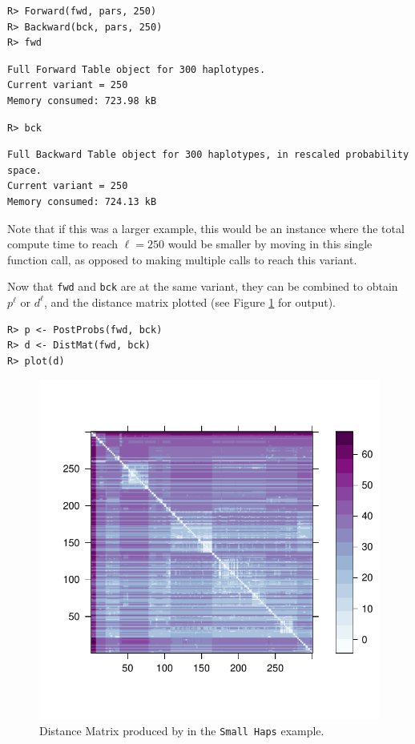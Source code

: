 \documentclass[a4paper]{article}
\begin{document}
\begin{verbatim}
R> Forward(fwd, pars, 250)
R> Backward(bck, pars, 250)
R> fwd
\end{verbatim}
\begin{verbatim}
Full Forward Table object for 300 haplotypes.
Current variant = 250
Memory consumed: 723.98 kB
\end{verbatim}
\begin{verbatim}
R> bck
\end{verbatim}
\begin{verbatim}
Full Backward Table object for 300 haplotypes, in rescaled probability space.
Current variant = 250
Memory consumed: 724.13 kB
\end{verbatim}

Note that if this was a larger example, this would be an instance where the total compute time to reach \(\ell=250\) would be smaller by moving in this single function call, as opposed to making multiple calls to reach this variant.

Now that \texttt{fwd} and \texttt{bck} are at the same variant, they can be combined to obtain \(p^\ell\) or \(d^\ell\), and the distance matrix plotted (see Figure \ref{fig:dist_mat_example} for output).

\begin{verbatim}
R> p <- PostProbs(fwd, bck)
R> d <- DistMat(fwd, bck)
R> plot(d)
\end{verbatim}

\begin{figure}
  \centering
  \includegraphics{fig}
	\caption{Distance Matrix produced by in the \texttt{Small Haps} example.}
	\label{fig:dist_mat_example}
\end{figure}
\end{document}
